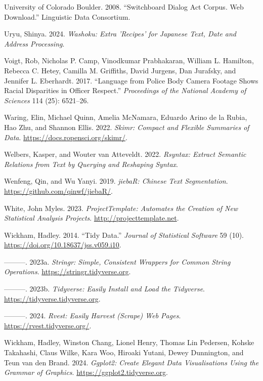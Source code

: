 \documentclass[
  letterpaper,
]{latex/krantz}
\newlength{\cslhangindent}
\newenvironment{CSLReferences}[2] %
 {\begin{list}{}{%
  \setlength{\itemindent}{0pt}
  \setlength{\leftmargin}{0pt}
  \setlength{\parsep}{0pt}
  \ifodd #1
   \setlength{\leftmargin}{\cslhangindent}
   \setlength{\itemindent}{-1\cslhangindent}
  \fi
  \setlength{\itemsep}{#2\baselineskip}}}
 {\end{list}}
\theoremstyle{definition}
\theoremstyle{remark}
\begin{document}
\begin{CSLReferences}{1}{0}
University of Colorado Boulder. 2008. {``Switchboard Dialog Act Corpus.
Web Download.''} Linguistic Data Consortium.

Uryu, Shinya. 2024. \emph{Washoku: Extra 'Recipes' for Japanese Text,
Date and Address Processing}.

Voigt, Rob, Nicholas P. Camp, Vinodkumar Prabhakaran, William L.
Hamilton, Rebecca C. Hetey, Camilla M. Griffiths, David Jurgens, Dan
Jurafsky, and Jennifer L. Eberhardt. 2017. {``Language from Police Body
Camera Footage Shows Racial Disparities in Officer Respect.''}
\emph{Proceedings of the National Academy of Sciences} 114 (25):
6521--26.

Waring, Elin, Michael Quinn, Amelia McNamara, Eduardo Arino de la Rubia,
Hao Zhu, and Shannon Ellis. 2022. \emph{Skimr: Compact and Flexible
Summaries of Data}. \url{https://docs.ropensci.org/skimr/}.

Welbers, Kasper, and Wouter van Atteveldt. 2022. \emph{Rsyntax: Extract
Semantic Relations from Text by Querying and Reshaping Syntax}.

Wenfeng, Qin, and Wu Yanyi. 2019. \emph{jiebaR: Chinese Text
Segmentation}. \url{https://github.com/qinwf/jiebaR/}.

White, John Myles. 2023. \emph{ProjectTemplate: Automates the Creation
of New Statistical Analysis Projects}. \url{http://projecttemplate.net}.

Wickham, Hadley. 2014. {``Tidy Data.''} \emph{Journal of Statistical
Software} 59 (10). \url{https://doi.org/10.18637/jss.v059.i10}.

---------. 2023a. \emph{Stringr: Simple, Consistent Wrappers for Common
String Operations}. \url{https://stringr.tidyverse.org}.

---------. 2023b. \emph{Tidyverse: Easily Install and Load the
Tidyverse}. \url{https://tidyverse.tidyverse.org}.

---------. 2024. \emph{Rvest: Easily Harvest (Scrape) Web Pages}.
\url{https://rvest.tidyverse.org/}.

Wickham, Hadley, Winston Chang, Lionel Henry, Thomas Lin Pedersen,
Kohske Takahashi, Claus Wilke, Kara Woo, Hiroaki Yutani, Dewey
Dunnington, and Teun van den Brand. 2024. \emph{Ggplot2: Create Elegant
Data Visualisations Using the Grammar of Graphics}.
\url{https://ggplot2.tidyverse.org}.


\end{CSLReferences}
\end{document}
